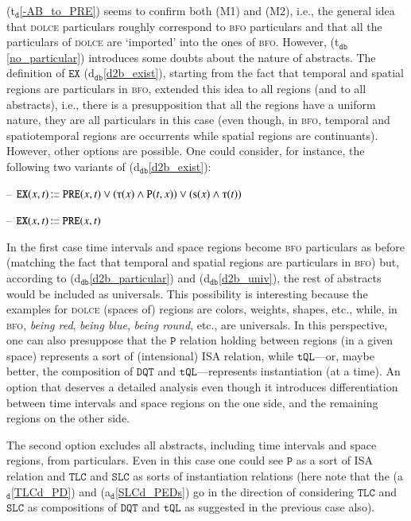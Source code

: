 \documentclass[ao]{iosart2x}
\newcommand{\bflist}{\begin{list}{}{\setlength{\topsep}{2mm}\setlength{\parsep}{0mm}\setlength{\leftmargin}{9.2mm}\setlength{\labelwidth}{8mm}}}
\newcommand{\eflist}{\end{list}}
\newcommand{\dolceAxLabel}{\textrm{a$_\texttt{d}$}}
\newcommand{\dolceThrLabel}{\textrm{t$_\texttt{d}$}}
\newcommand{\dbDefLabel}{\textrm{d$_\texttt{db}$}}
\newcommand{\dbThrLabel}{\textrm{t$_\texttt{db}$}}
\newcommand{\refdolceax}[1]{({\dolceAxLabel}\ref{#1})}
\newcommand{\refdolceth}[1]{({\dolceThrLabel}\ref{#1})}
\newcommand{\refdbdf}[1]{({\dbDefLabel}\ref{#1})}
\newcommand{\refdbth}[1]{({\dbThrLabel}\ref{#1})}
\newcommand{\pr}[1]{\mathtt{#1}}
\newcommand\textequal{%
 \rule[.08ex]{5pt}{0.35pt}\llap{\rule[.78ex]{5pt}{0.35pt}}}
\newcommand{\sdef}{{\hspace{1.5pt}:\hspace{-2.5pt}\textequal\hspace{3pt}}}
\newcommand{\dolce}{{\textsc{dolce}}}
\newcommand{\bfo}{{\textsc{bfo}}}
\newcommand {\Sdcat} {\textsc{s}}
\newcommand {\Tdcat} {\textsc{t}}
\newcommand {\Pd} {\ensuremath{\pr{P}}}
\newcommand {\PREd} {\ensuremath{\pr{PRE}}}
\newcommand {\DQTd} {\ensuremath{\pr{DQT}}}
\newcommand {\TQLd} {\ensuremath{\pr{tQL}}}
\newcommand {\SLCd} {\ensuremath{\pr{SLC}}}
\newcommand {\TLCd} {\ensuremath{\pr{TLC}}}
\newcommand{\bfoexist}{\pr{EX}}
\begin{document}
\refdolceth{-AB_to_PRE} seems to confirm both (M1) and (M2), i.e., the general idea that {\dolce} particulars roughly correspond to {\bfo} particulars and that all the particulars of {\dolce} are `imported' into the ones of {\bfo}. However, \refdbth{no_particular} introduces some doubts about the nature of abstracts. The definition of $\bfoexist$ \refdbdf{d2b_exist}, starting from the fact that temporal and spatial regions are particulars in {\bfo}, extended this idea to all regions (and to all abstracts), i.e., there is a presupposition that all the regions have a uniform nature, they are all particulars in this case (even though, in {\bfo}, temporal and spatiotemporal regions are occurrents while spatial regions are continuants). However, other options are possible. One could consider, for instance, the following two variants of \refdbdf{d2b_exist}:
\bflist
\item[--] $\bfoexist(x,t)\sdef \PREd(x,t) \lor (\Tdcat(x) \land \Pd(t,x)) \lor (\Sdcat(x) \land \Tdcat(t))$
\item[--] $\bfoexist(x,t)\sdef \PREd(x,t)$
\eflist
%
In the first case time intervals and space regions become {\bfo} particulars as before (matching the fact that temporal and spatial regions are particulars in {\bfo}) but, according to \refdbdf{d2b_particular} and \refdbdf{d2b_univ}, the rest of abstracts would be included as universals. This possibility is interesting because the examples for {\dolce} (spaces of) regions are colors, weights, shapes, etc., while, in {\bfo}, \emph{being red}, \emph{being blue}, \emph{being round}, etc., are universals. In this perspective, one can also presuppose that the $\Pd$ relation holding between regions (in a given space) represents a sort of (intensional) ISA relation, while $\TQLd$---or, maybe better, the composition of $\DQTd$ and  $\TQLd$---represents instantiation (at a time). An option that deserves a detailed analysis even though it introduces differentiation between time intervals and space regions on the one side, and the remaining regions on the other side. 

The second option excludes all abstracts, including time intervals and space regions, from particulars. Even in this case one could see $\Pd$ as a sort of ISA relation and $\TLCd$ and $\SLCd$ as sorts of instantiation relations (here note that the \refdolceax{TLCd_PD} and  \refdolceax{SLCd_PEDs} go in the direction of considering $\TLCd$ and $\SLCd$ as compositions of $\DQTd$ and  $\TQLd$ as suggested in the previous case also).
\end{document}

